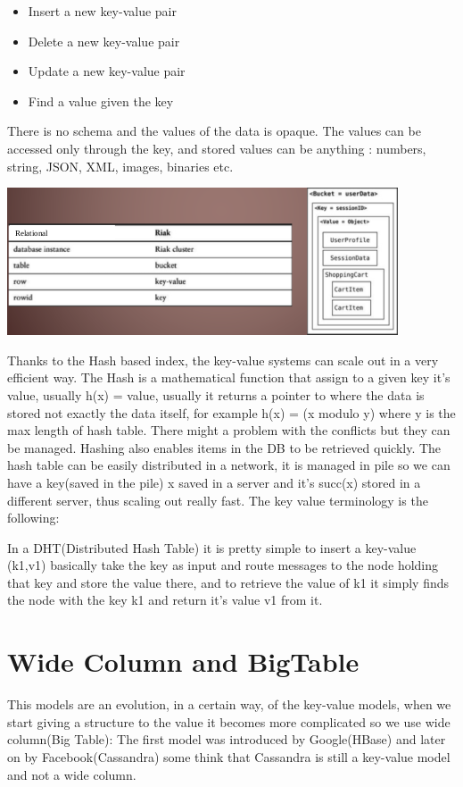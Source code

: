 \documentclass[a4page, 11pt]{article}
\begin{document}
\begin{itemize}[noitemsep]
	\item
	Insert a new key-value pair
	\item
	Delete a new key-value pair
	\item
	Update a new key-value pair
	\item
	Find a value given the key
\end{itemize}

There is no schema and the values of the data is opaque. The values can be accessed only through the key, and stored values can be anything : numbers, string, JSON, XML, images, binaries etc.
\begin{center}
	\includegraphics[scale=0.6]{IMAGE4.jpg}
\end{center}
Thanks to the Hash based index, the key-value systems can scale out in a very efficient way. 
The Hash is a mathematical function that assign to a given key it's value, usually h(x) = value, usually it returns a pointer
to where the data is stored not exactly the data itself, for example h(x) = (x modulo y) where y is the max length of hash table. 
There might a problem with the conflicts but they can be managed. 
Hashing also enables items in the DB to be retrieved quickly. 
The hash table can be easily distributed in a network, it is managed in pile so we can have a key(saved in the pile) x saved in a server and it's succ(x) stored in a different server, thus scaling out really fast. 
The key value terminology is the following:

In a DHT(Distributed Hash Table) it is pretty simple to insert a key-value (k1,v1) basically take the key as input and route messages to the node holding that key and store the value there, and to retrieve the value of k1 it simply finds the node with the key k1 and return it's value v1 from it.

\section{Wide Column and BigTable}
This models are an evolution, in a certain way, of the key-value models, when we start giving a structure to the value it becomes more complicated so we use wide column(Big Table): The first model was introduced by Google(HBase) and later on by Facebook(Cassandra) some think that Cassandra is still a key-value model and not a wide column.
\end{document}
